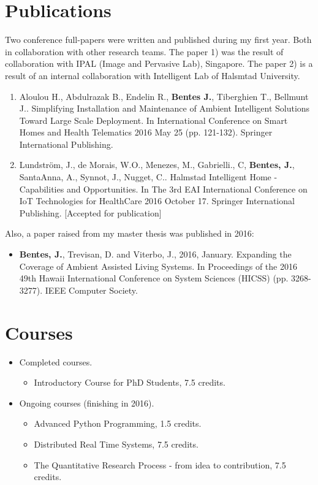 \documentclass[]{report}
\begin{document}
\section*{Publications}

Two conference full-papers were written and published during my first year. Both in collaboration with other research teams. The paper 1) was the result of collaboration with IPAL (Image and Pervasive Lab), Singapore. The paper 2) is a result of an internal collaboration with Intelligent Lab of Halsmtad University.

\begin{enumerate}
	\item Aloulou H., Abdulrazak B., Endelin R., \textbf{Bentes J.}, Tiberghien T., Bellmunt J.. Simplifying Installation and Maintenance of Ambient Intelligent Solutions Toward Large Scale Deployment. In International Conference on Smart Homes and Health Telematics 2016 May 25 (pp. 121-132). Springer International Publishing.
	\item Lundstr\"{o}m, J., de Morais, W.O., Menezes, M., Gabrielli., C, \textbf{Bentes, J.}, SantaAnna, A., Synnot, J., Nugget, C.. Halmstad Intelligent Home - Capabilities and Opportunities. In The 3rd EAI International Conference on IoT Technologies for HealthCare 2016 October 17. Springer International Publishing. [Accepted for publication]
\end{enumerate}

\noindent Also, a paper raised from my master thesis was published in 2016:

\begin{itemize}
	\item \textbf{Bentes, J.}, Trevisan, D. and Viterbo, J., 2016, January. Expanding the Coverage of Ambient Assisted Living Systems. In Proceedings of the 2016 49th Hawaii International Conference on System Sciences (HICSS) (pp. 3268-3277). IEEE Computer Society. 
\end{itemize}

\section*{Courses}

\begin{itemize} 
	\item Completed courses.
	\begin{itemize}
		\item Introductory Course for PhD Students, 7.5 credits.
	\end{itemize}	
	\item Ongoing courses (finishing in 2016).
		\begin{itemize}
			\item Advanced Python Programming, 1.5 credits.
			\item Distributed Real Time Systems, 7.5 credits.
			\item The Quantitative Research Process - from idea to contribution, 7.5 credits.
		\end{itemize}
\end{itemize}
\end{document}
